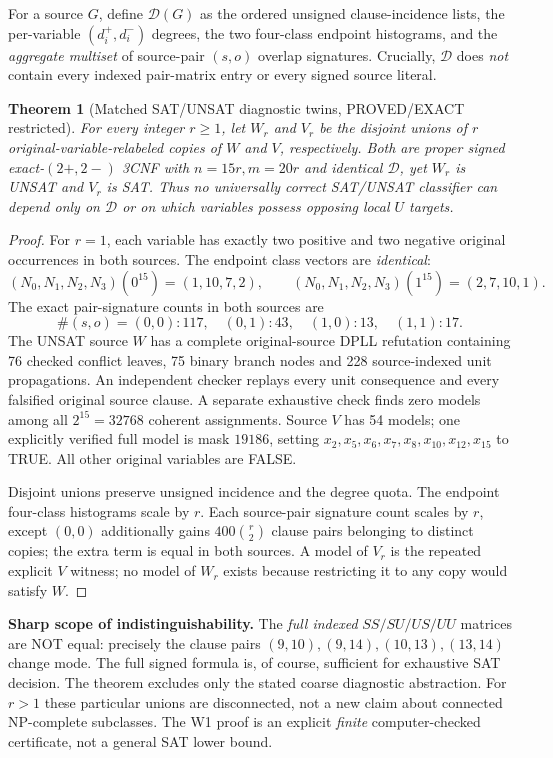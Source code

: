 \documentclass[10pt]{article}
\newtheorem{theorem}{Theorem}
\begin{document}
For a source $G$, define $\mathcal{D}(G)$ as the ordered unsigned clause-incidence lists, the per-variable $(d_i^+,d_i^-)$ degrees, the two four-class endpoint histograms, and the \emph{aggregate multiset} of source-pair $(s,o)$ overlap signatures. Crucially, $\mathcal{D}$ does \emph{not} contain every indexed pair-matrix entry or every signed source literal.

\begin{theorem}[Matched SAT/UNSAT diagnostic twins, PROVED/EXACT restricted]
For every integer $r\ge1$, let $W_r$ and $V_r$ be the disjoint unions of $r$ original-variable-relabeled copies of $W$ and $V$, respectively. Both are proper signed exact-$(2+,2-)$ 3CNF with $n=15r,m=20r$ and identical $\mathcal{D}$, yet $W_r$ is UNSAT and $V_r$ is SAT. Thus no universally correct SAT/UNSAT classifier can depend \emph{only} on $\mathcal D$ or on which variables possess opposing local $U$ targets.
\end{theorem}
\begin{proof}
For $r=1$, each variable has exactly two positive and two negative original occurrences in both sources. The endpoint class vectors are \emph{identical}:
\[
 (N_0,N_1,N_2,N_3)(0^{15})=(1,10,7,2),\qquad
 (N_0,N_1,N_2,N_3)(1^{15})=(2,7,10,1).
\]
The exact pair-signature counts in both sources are
\[
 \#(s,o)=(0,0):117,\quad(0,1):43,\quad(1,0):13,\quad(1,1):17.
\]
The UNSAT source $W$ has a complete original-source DPLL refutation containing 76 checked conflict leaves, 75 binary branch nodes and 228 source-indexed unit propagations. An independent checker replays every unit consequence and every falsified original source clause. A separate exhaustive check finds zero models among all $2^{15}=32768$ coherent assignments. Source $V$ has 54 models; one explicitly verified full model is mask $19186$, setting $x_{2},x_{5},x_{6},x_{7},x_{8},x_{10},x_{12},x_{15}$ to TRUE. All other original variables are FALSE.

Disjoint unions preserve unsigned incidence and the degree quota. The endpoint four-class histograms scale by $r$. Each source-pair signature count scales by $r$, except $(0,0)$ additionally gains $400\binom r2$ clause pairs belonging to distinct copies; the extra term is equal in both sources. A model of $V_r$ is the repeated explicit $V$ witness; no model of $W_r$ exists because restricting it to any copy would satisfy $W$.\end{proof}

\noindent\textbf{Sharp scope of indistinguishability.} The \emph{full indexed} $SS/SU/US/UU$ matrices are NOT equal: precisely the clause pairs $(9,10),(9,14),(10,13),(13,14)$ change mode. The full signed formula is, of course, sufficient for exhaustive SAT decision. The theorem excludes only the stated coarse diagnostic abstraction. For $r>1$ these particular unions are disconnected, not a new claim about connected NP-complete subclasses. The W1 proof is an explicit \emph{finite} computer-checked certificate, not a general SAT lower bound.
\end{document}
